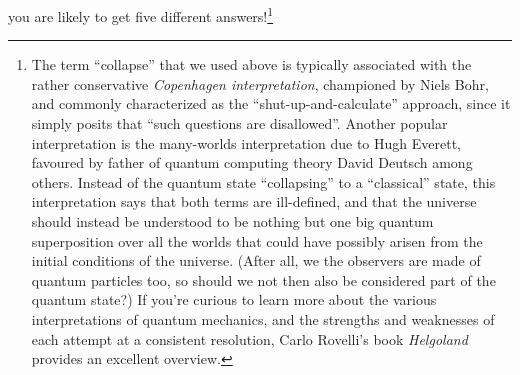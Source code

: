         you are likely to get five different answers!\footnote{
          The term ``collapse'' that we
          used above is typically associated with the rather conservative
          \emph{Copenhagen interpretation}, championed by Niels Bohr, and commonly
          characterized as the ``shut-up-and-calculate'' approach, since
          it simply posits that ``such questions are disallowed''.
          Another popular interpretation is the many-worlds interpretation due
          to Hugh Everett, favoured by father of quantum computing theory
          David Deutsch among others. Instead of the quantum state
          ``collapsing'' to a ``classical'' state, this interpretation says that
          both terms are ill-defined, and that the universe should instead be
          understood to be nothing but one big quantum superposition over all
          the worlds that could have possibly arisen from
          the initial conditions of the universe.
          (After all, we the observers are made of quantum particles too, so
          should we not then also be considered part of the quantum state?)
          If you're curious to learn more about the various interpretations of
          quantum mechanics, and the strengths and weaknesses of each attempt
          at a consistent resolution, Carlo Rovelli's book \emph{Helgoland} provides an
          excellent overview.
        }

